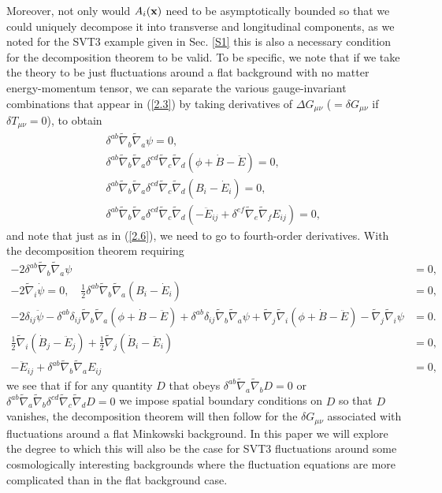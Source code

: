 \documentclass[aps,onecolumn,10pt]{revtex4}
\numberwithin{equation}{section}
\numberwithin{equation}{section}
\begin{document}
Moreover, not only would  $A_i({\bf x})$ need to be asymptotically bounded so that we could uniquely decompose it into transverse and longitudinal components, as we noted for the SVT3 example given in Sec. \ref{S1} this is also a necessary condition for the decomposition theorem to be valid. To be specific, we note that if we take the theory to be just fluctuations around a flat background with no matter energy-momentum tensor, we can separate the various gauge-invariant combinations that appear in (\ref{2.3}) by taking derivatives of $\Delta G_{\mu\nu}$ ($=\delta G_{\mu\nu}$ if $\delta T_{\mu\nu}=0$), to obtain
%
\begin{eqnarray}
&&\delta^{ab} \tilde{\nabla}_{b}\tilde{\nabla}_{a}\psi=0,
\nonumber\\
 &&\delta^{ab} \tilde{\nabla}_{b}\tilde{\nabla}_{a} \delta^{cd} \tilde{\nabla}_{c}\tilde{\nabla}_{d}(\phi+\dot{B}  -\ddot{E})=0,
 \nonumber\\
 &&\delta^{ab} \tilde{\nabla}_{b}\tilde{\nabla}_{a} \delta^{cd} \tilde{\nabla}_{c}\tilde{\nabla}_{d}(B_i-\dot{E}_i)=0,
 \nonumber\\
 &&\delta^{ab} \tilde{\nabla}_{b}\tilde{\nabla}_{a} \delta^{cd} \tilde{\nabla}_{c}\tilde{\nabla}_{d}(-\ddot{E}_{ij}+\delta^{ef} \tilde{\nabla}_{e}\tilde{\nabla}_{f}E_{ij})=0,
\label{2.19}
\end{eqnarray}
%
and note that just as in (\ref{2.6}), we need to go to fourth-order derivatives. With the decomposition theorem requiring
%
\begin{align}
- 2 \delta^{ab} \tilde{\nabla}_{b}\tilde{\nabla}_{a}\psi&=0,
\nonumber\\
- 2 \tilde{\nabla}_{i}\dot{\psi}=0,\quad \tfrac{1}{2} \delta^{ab} \tilde{\nabla}_{b}\tilde{\nabla}_{a}(B_{i} -  \dot{E}_{i})&=0,
\nonumber\\
 -2 \delta_{ij} \ddot{\psi} -  \delta^{ab} \delta_{ij} \tilde{\nabla}_{b}\tilde{\nabla}_{a}(\phi+\dot{B}  -\ddot{E})+ \delta^{ab} \delta_{ij} \tilde{\nabla}_{b}\tilde{\nabla}_{a}\psi +\tilde{\nabla}_{j}\tilde{\nabla}_{i}(\phi+\dot{B} -  \ddot{E})  -  \tilde{\nabla}_{j}\tilde{\nabla}_{i}\psi&=0.
\nonumber\\
 \tfrac{1}{2} \tilde{\nabla}_{i}(\dot{B}_{j} - \ddot{E}_{j}) + \tfrac{1}{2} \tilde{\nabla}_{j}(\dot{B}_{i} 
- \ddot{E}_{i})&=0,
\nonumber\\
- \ddot{E}_{ij} + \delta^{ab} \tilde{\nabla}_{b}\tilde{\nabla}_{a}E_{ij}&=0,
\label{2.20}
\end{align}
%
we see that if for any quantity $D$ that obeys  $\delta^{ab} \tilde{\nabla}_{a}\tilde{\nabla}_{b}D=0$ or $\delta^{ab} \tilde{\nabla}_{a}\tilde{\nabla}_{b}\delta^{cd} \tilde{\nabla}_{c}\tilde{\nabla}_{d}D=0$ we impose spatial boundary conditions on $D$ so that $D$ vanishes,  the decomposition theorem will then follow for the $\delta G_{\mu\nu}$ associated with fluctuations around a flat Minkowski background. In this paper we will explore the degree to which this will also be the case for SVT3 fluctuations around some cosmologically interesting backgrounds where the fluctuation equations are more complicated than in the flat background case.
\end{document}
